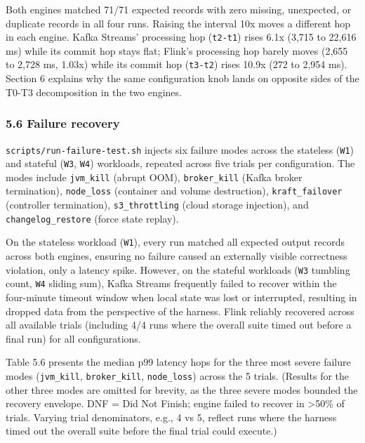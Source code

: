 \documentclass[
]{article}
\begin{document}
Both engines matched 71/71 expected records with zero missing,
unexpected, or duplicate records in all four runs. Raising the interval
10x moves a different hop in each engine. Kafka Streams' processing hop
(\texttt{t2-t1}) rises 6.1x (3,715 to 22,616 ms) while its commit hop
stays flat; Flink's processing hop barely moves (2,655 to 2,728 ms,
1.03x) while its commit hop (\texttt{t3-t2}) rises 10.9x (272 to 2,954
ms). Section 6 explains why the same configuration knob lands on
opposite sides of the T0-T3 decomposition in the two engines.

\hypertarget{failure-recovery}{%
\subsubsection{5.6 Failure recovery}\label{failure-recovery}}

\texttt{scripts/run-failure-test.sh} injects six failure modes across
the stateless (\texttt{W1}) and stateful (\texttt{W3}, \texttt{W4})
workloads, repeated across five trials per configuration. The modes
include \texttt{jvm\_kill} (abrupt OOM), \texttt{broker\_kill} (Kafka
broker termination), \texttt{node\_loss} (container and volume
destruction), \texttt{kraft\_failover} (controller termination),
\texttt{s3\_throttling} (cloud storage injection), and
\texttt{changelog\_restore} (force state replay).

On the stateless workload (\texttt{W1}), every run matched all expected
output records across both engines, ensuring no failure caused an
externally visible correctness violation, only a latency spike. However,
on the stateful workloads (\texttt{W3} tumbling count, \texttt{W4}
sliding sum), Kafka Streams frequently failed to recover within the
four-minute timeout window when local state was lost or interrupted,
resulting in dropped data from the perspective of the harness. Flink
reliably recovered across all available trials (including 4/4 runs where
the overall suite timed out before a final run) for all configurations.

Table 5.6 presents the median p99 latency hops for the three most severe
failure modes (\texttt{jvm\_kill}, \texttt{broker\_kill},
\texttt{node\_loss}) across the 5 trials. (Results for the other three
modes are omitted for brevity, as the three severe modes bounded the
recovery envelope. DNF = Did Not Finish; engine failed to recover in
\textgreater50\% of trials. Varying trial denominators, e.g., 4 vs 5,
reflect runs where the harness timed out the overall suite before the
final trial could execute.)
\end{document}
